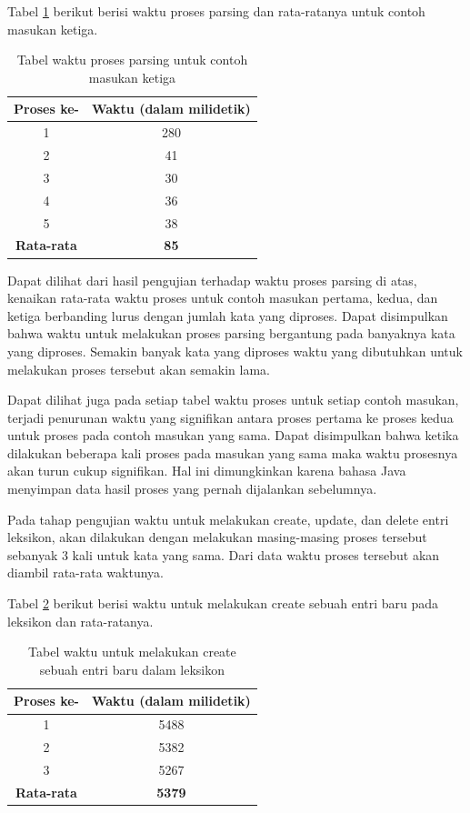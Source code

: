 Tabel \ref{tabel-waktu-parsing-ketiga} berikut berisi waktu proses parsing dan rata-ratanya untuk contoh masukan ketiga.

\begin{table}[H]
\centering
\begin{tabular}{|c|c|}
\hline
\textbf{Proses ke-} & \textbf{Waktu} (dalam milidetik) \\
\hline
1&280\\
2&41\\
3&30\\
4&36\\
5&38\\
\hline
\textbf{Rata-rata} & \textbf{85}\\
\hline
\end{tabular}
\caption{Tabel waktu proses parsing untuk contoh masukan ketiga} 
\label{tabel-waktu-parsing-ketiga}
\end{table}

Dapat dilihat dari hasil pengujian terhadap waktu proses parsing di atas, kenaikan rata-rata waktu proses untuk contoh masukan pertama, kedua, dan ketiga berbanding lurus dengan jumlah kata yang diproses. Dapat disimpulkan bahwa waktu untuk melakukan proses parsing bergantung pada banyaknya kata yang diproses. Semakin banyak kata yang diproses waktu yang dibutuhkan untuk melakukan proses tersebut akan semakin lama.

Dapat dilihat juga pada setiap tabel waktu proses untuk setiap contoh masukan, terjadi penurunan waktu yang signifikan antara proses pertama ke proses kedua untuk proses pada contoh masukan yang sama. Dapat disimpulkan bahwa ketika dilakukan beberapa kali proses pada masukan yang sama maka waktu prosesnya akan turun cukup signifikan. Hal ini dimungkinkan karena bahasa Java menyimpan data hasil proses yang pernah dijalankan sebelumnya.

Pada tahap pengujian waktu untuk melakukan create, update, dan delete entri leksikon, akan dilakukan dengan melakukan masing-masing proses tersebut sebanyak 3 kali untuk kata yang sama. Dari data waktu proses tersebut akan diambil rata-rata waktunya.

Tabel \ref{tabel-waktu-create} berikut berisi waktu untuk melakukan create sebuah entri baru pada leksikon dan rata-ratanya.

\begin{table}[H]
\centering
\begin{tabular}{|c|c|}
\hline
\textbf{Proses ke-} & \textbf{Waktu} (dalam milidetik) \\
\hline
1&5488\\
2&5382\\
3&5267\\
\hline
\textbf{Rata-rata} & \textbf{5379}\\
\hline
\end{tabular}
\caption{Tabel waktu untuk melakukan create sebuah entri baru dalam leksikon} 
\label{tabel-waktu-create}
\end{table}

